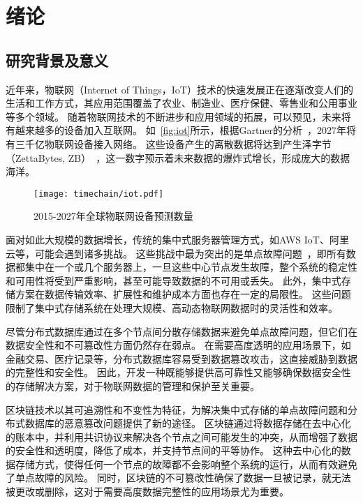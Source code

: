 
\chapter{绪论}
\section{研究背景及意义}
近年来，物联网（Internet of Things，IoT）技术的快速发展正在逐渐改变人们的生活和工作方式，其应用范围覆盖了农业、制造业、医疗保健、零售业和公用事业等多个领域。
随着物联网技术的不断进步和应用领域的拓展，可以预见，未来将有越来越多的设备加入互联网。
如~\autoref{fig:iot}所示，根据Gartner的分析~\cite{hung2017leading}，2027年将有三千亿物联网设备接入网络。
这些设备产生的离散数据将达到产生泽字节（ZettaBytes, ZB）~\cite{al2020internet}，这一数字预示着未来数据的爆炸式增长，形成庞大的数据海洋。

\begin{figure}[t]
    \centering
    \texttt{[image: timechain/iot.pdf]}
    \caption{2015-2027年全球物联网设备预测数量}
    \label{fig:iot}
\end{figure}

面对如此大规模的数据增长，传统的集中式服务器管理方式，如AWS IoT、阿里云等，可能会遇到诸多挑战。
这些挑战中最为突出的是单点故障问题~\cite{gill2011understanding}，即所有数据都集中在一个或几个服务器上，一旦这些中心节点发生故障，整个系统的稳定性和可用性将受到严重影响，甚至可能导致数据的不可用或丢失。
此外，集中式存储方案在数据传输效率、扩展性和维护成本方面也存在一定的局限性。
这些问题限制了集中式存储系统在处理大规模、高动态物联网数据时的灵活性和效率。

尽管分布式数据库通过在多个节点间分散存储数据来避免单点故障问题，但它们在数据安全性和不可篡改性方面仍然存在弱点。
在需要高度透明的应用场景下，如金融交易、医疗记录等，分布式数据库容易受到数据篡改攻击，这直接威胁到数据的完整性和安全性。
因此，开发一种既能够提供高可靠性又能够确保数据安全性的存储解决方案，对于物联网数据的管理和保护至关重要。

区块链技术以其可追溯性和不变性为特征，为解决集中式存储的单点故障问题和分布式数据库的恶意篡改问题提供了新的途径。
区块链通过将数据存储在去中心化的账本中，并利用共识协议来解决各个节点之间可能发生的冲突，从而增强了数据的安全性和透明度，降低了成本，并支持节点间的平等协作。
这种去中心化的数据存储方式，使得任何一个节点的故障都不会影响整个系统的运行，从而有效避免了单点故障的风险。
同时，区块链的不可篡改性确保了数据一旦被记录，就无法被更改或删除，这对于需要高度数据完整性的应用场景尤为重要。

